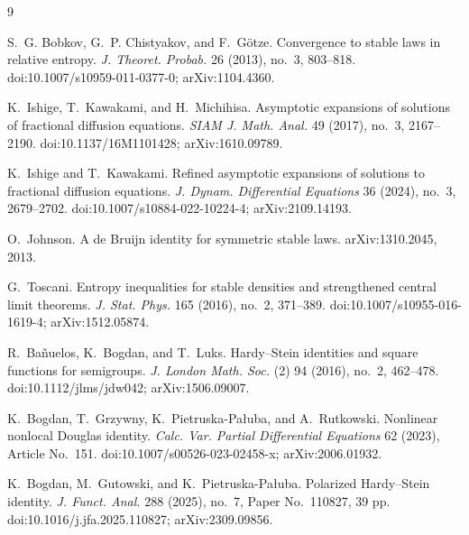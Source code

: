 \begin{thebibliography}{9}

S.~G. Bobkov, G.~P. Chistyakov, and F.~G\"otze.
\newblock Convergence to stable laws in relative entropy.
\newblock \emph{J. Theoret. Probab.} 26 (2013), no.~3, 803--818.
\newblock doi:10.1007/s10959-011-0377-0; arXiv:1104.4360.

K.~Ishige, T.~Kawakami, and H.~Michihisa.
\newblock Asymptotic expansions of solutions of fractional diffusion
equations.
\newblock \emph{SIAM J. Math. Anal.} 49 (2017), no.~3, 2167--2190.
\newblock doi:10.1137/16M1101428; arXiv:1610.09789.

K.~Ishige and T.~Kawakami.
\newblock Refined asymptotic expansions of solutions to fractional diffusion
equations.
\newblock \emph{J. Dynam. Differential Equations} 36 (2024), no.~3,
2679--2702.
\newblock doi:10.1007/s10884-022-10224-4; arXiv:2109.14193.

O.~Johnson.
\newblock A de Bruijn identity for symmetric stable laws.
\newblock arXiv:1310.2045, 2013.

G.~Toscani.
\newblock Entropy inequalities for stable densities and strengthened central
limit theorems.
\newblock \emph{J. Stat. Phys.} 165 (2016), no.~2, 371--389.
\newblock doi:10.1007/s10955-016-1619-4; arXiv:1512.05874.

R.~Ba{\~n}uelos, K.~Bogdan, and T.~Luks.
\newblock Hardy--Stein identities and square functions for semigroups.
\newblock \emph{J. London Math. Soc.} (2) 94 (2016), no.~2, 462--478.
\newblock doi:10.1112/jlms/jdw042; arXiv:1506.09007.

K.~Bogdan, T.~Grzywny, K.~Pietruska-Pa{\l}uba, and A.~Rutkowski.
\newblock Nonlinear nonlocal Douglas identity.
\newblock \emph{Calc. Var. Partial Differential Equations} 62 (2023),
Article No.~151.
\newblock doi:10.1007/s00526-023-02458-x; arXiv:2006.01932.

K.~Bogdan, M.~Gutowski, and K.~Pietruska-Pa{\l}uba.
\newblock Polarized Hardy--Stein identity.
\newblock \emph{J. Funct. Anal.} 288 (2025), no.~7, Paper No.~110827,
39 pp.
\newblock doi:10.1016/j.jfa.2025.110827; arXiv:2309.09856.


\end{thebibliography}
